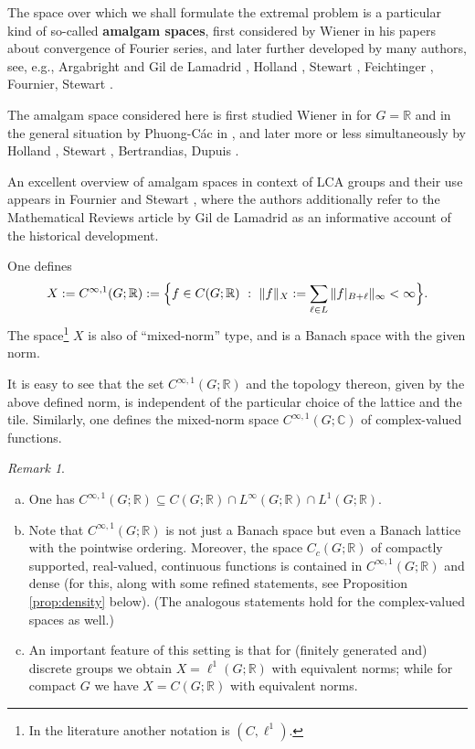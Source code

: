 \documentclass[[a4paper,english,12pt]{amsart}
\theoremstyle{plain}
\theoremstyle{remark}
\newtheorem{remark}[theorem]{Remark}
\newcommand{\RR}{\mathbb R}
\newcommand{\CC}{\mathbb C}
\begin{document}
The space over which we shall formulate the extremal problem is a particular kind of so-called \textbf{amalgam spaces}, first considered by Wiener in his papers \cite{Wiener, Wiener2} about convergence of Fourier series, and later further developed by many authors, see, e.g., Argabright and Gil de Lamadrid \cite{AG-apm}, Holland \cite{Holland1975, Holland75b}, Stewart \cite{Stewart1979}, Feichtinger \cite{Feichtinger1977, Feichtinger1983}, Fournier, Stewart \cite{FournierStewart1985}.


The amalgam space considered here is first studied Wiener in \cite{Wiener2} for $G=\mathbb{R}$ and in the general situation by Phuong-C\'ac in \cite{Cac}, and later more or less simultaneously by  Holland \cite{Holland1975}, Stewart \cite{Stewart1979},  Bertrandias, Dupuis \cite{BD}.

 An excellent overview of amalgam spaces in context of LCA groups and their use appears in Fournier and Stewart \cite{FournierStewart1985}, where the authors additionally refer to the Mathematical Reviews article \cite{GilReview} by Gil de Lamadrid as an informative account of the historical development.


One defines
\[
X:=C^{\infty,1}(G;\RR):=\Bigl\{ f \in C(G;\RR)~:~ \|f\|_X:=\sum_{\ell \in L} \|f|_{B+\ell}\|_\infty < \infty\Bigr\}.
\]
The space\footnote{In the literature another notation is $(C,\ell^1).$} $X$ is also of ``mixed-norm'' type, and is a Banach space with the given norm.

  It is easy to see that the set $C^{\infty,1}(G;\RR)$ and the topology thereon, given by the above defined norm, is independent of the particular choice of the lattice and the tile.
Similarly, one defines the mixed-norm space $C^{\infty,1}(G;\CC)$ of complex-valued functions.

\begin{remark}
	\begin{enumerate}[(a)]
\item One has $C^{\infty,1}(G;\RR)\subseteq C(G;\RR)\cap L^\infty(G;\RR)\cap L^1(G;\RR)$.
	\item Note that $C^{\infty,1}(G;\RR)$ is not just a Banach space but even a Banach lattice with the pointwise ordering.  Moreover, the space $C_c(G;\RR)$ of compactly supported, real-valued, continuous functions is contained in $C^{\infty,1}(G;\RR)$ and dense (for this, along with some refined statements, see Proposition \ref{prop:density} below). (The analogous statements hold for the complex-valued spaces as well.)
	\item
An important feature of this setting is that for (finitely generated and) discrete groups we obtain $X=\ell^1(G;\RR)$ with equivalent norms; while for compact $G$ we have $X=C(G;\RR)$ with equivalent norms.
\end{enumerate}
\end{remark}
\end{document}
